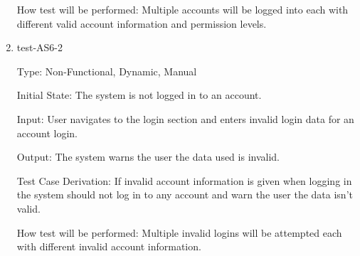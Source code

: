 \documentclass[12pt, titlepage]{article}
\begin{document}
\begin{enumerate}
  How test will be performed: Multiple accounts will be logged into each with
  different valid account information and permission levels.

  \item{test-AS6-2\\}

  Type: Non-Functional, Dynamic, Manual

  Initial State: The system is not logged in to an account.

  Input: User navigates to the login section and enters invalid login data
  for an account login.

  Output: The system warns the user the data used is invalid.

  Test Case Derivation: If invalid account information is given when logging
  in the system should not log in to any account and warn the user the data
  isn't valid.

  How test will be performed: Multiple invalid logins will be attempted each
  with different invalid account information.

  
            
            
            
            








\end{enumerate}
\end{document}
